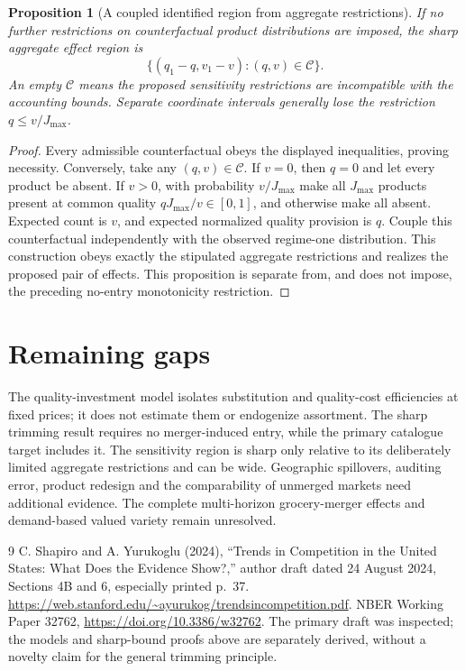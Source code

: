 \documentclass[11pt,a4paper]{article}
\newtheorem{proposition}[theorem]{Proposition}
\theoremstyle{definition}
\theoremstyle{remark}
\begin{document}
\begin{proposition}[A coupled identified region from aggregate restrictions]
If no further restrictions on counterfactual product distributions are imposed, the sharp aggregate effect region is
\[
 \{(q_1-q,v_1-v):(q,v)\in\mathcal C\}.
\]
An empty $\mathcal C$ means the proposed sensitivity restrictions are incompatible with the accounting bounds. Separate coordinate intervals generally lose the restriction $q\leq v/J_{\max}$.
\end{proposition}
\begin{proof}
Every admissible counterfactual obeys the displayed inequalities, proving necessity. Conversely, take any $(q,v)\in\mathcal C$. If $v=0$, then $q=0$ and let every product be absent. If $v>0$, with probability $v/J_{\max}$ make all $J_{\max}$ products present at common quality $qJ_{\max}/v\in[0,1]$, and otherwise make all absent. Expected count is $v$, and expected normalized quality provision is $q$. Couple this counterfactual independently with the observed regime-one distribution. This construction obeys exactly the stipulated aggregate restrictions and realizes the proposed pair of effects. This proposition is separate from, and does not impose, the preceding no-entry monotonicity restriction.
\end{proof}

\section{Remaining gaps}
The quality-investment model isolates substitution and quality-cost efficiencies at fixed prices; it does not estimate them or endogenize assortment. The sharp trimming result requires no merger-induced entry, while the primary catalogue target includes it. The sensitivity region is sharp only relative to its deliberately limited aggregate restrictions and can be wide. Geographic spillovers, auditing error, product redesign and the comparability of unmerged markets need additional evidence. The complete multi-horizon grocery-merger effects and demand-based valued variety remain unresolved.

\begin{thebibliography}{9}
 C. Shapiro and A. Yurukoglu (2024), ``Trends in Competition in the United States: What Does the Evidence Show?,'' author draft dated 24 August 2024, Sections 4B and 6, especially printed p.~37. \url{https://web.stanford.edu/~ayurukog/trendsincompetition.pdf}. NBER Working Paper 32762, \url{https://doi.org/10.3386/w32762}. The primary draft was inspected; the models and sharp-bound proofs above are separately derived, without a novelty claim for the general trimming principle.
\end{thebibliography}
\end{document}
